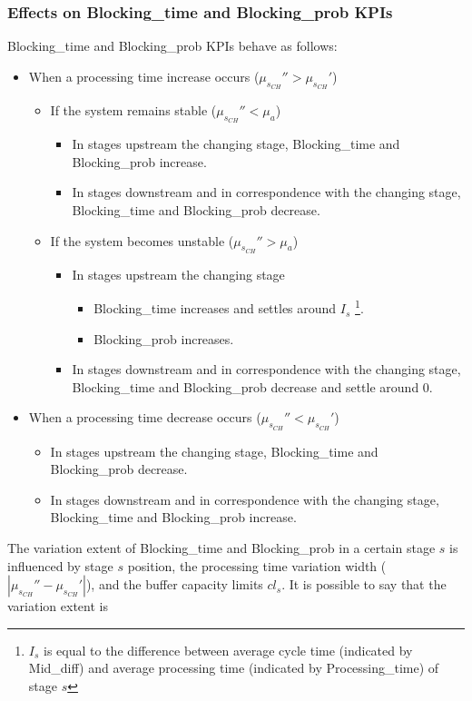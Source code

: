 \subsubsection{Effects on Blocking\_time and Blocking\_prob KPIs}
Blocking\_time and Blocking\_prob KPIs behave as follows:
\begin{itemize}
\item When a processing time increase occurs ($\mu_{s_{CH}}''>\mu_{s_{CH}}'$)
\begin{itemize}
\item If the system remains stable ($\mu_{s_{CH}}''<\mu_a$)
\begin{itemize}
\item In stages upstream the changing stage, Blocking\_time and Blocking\_prob increase.
\item In stages downstream and in correspondence with the changing stage, Blocking\_time and Blocking\_prob decrease.
\end{itemize}
\item If the system becomes unstable ($\mu_{s_{CH}}''>\mu_a$)
\begin{itemize}
\item In stages upstream the changing stage
\begin{itemize}
\item Blocking\_time increases and settles around $I_s$ \footnote{$I_s$ is equal to the difference between average cycle time (indicated by Mid\_diff) and average processing time (indicated by Processing\_time) of stage $s$}.
\item Blocking\_prob increases.
\end{itemize}
\item In stages downstream and in correspondence with the changing stage, Blocking\_time and Blocking\_prob decrease and settle around $0$.
\end{itemize}
\end{itemize}
\item When a processing time decrease occurs ($\mu_{s_{CH}}''<\mu_{s_{CH}}'$)
\begin{itemize}
\item In stages upstream the changing stage, Blocking\_time and Blocking\_prob decrease.
\item In stages downstream and in correspondence with the changing stage, Blocking\_time and Blocking\_prob increase.
\end{itemize}
\end{itemize}
The variation extent of Blocking\_time and Blocking\_prob in a certain stage $s$ is influenced by stage $s$ position, the processing time variation width ($|\mu_{s_{CH}}''-\mu_{s_{CH}}'|$), and the buffer capacity limits $cl_s$. It is possible to say that the variation extent is 

